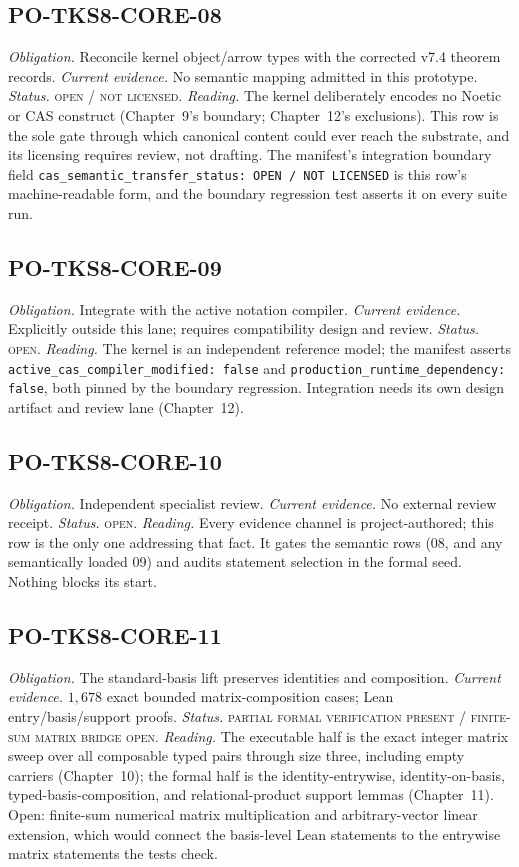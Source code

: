 \subsection*{PO-TKS8-CORE-08}
\emph{Obligation.} Reconcile kernel object/arrow types with the
corrected v7.4 theorem records. \emph{Current evidence.} No semantic
mapping admitted in this prototype. \emph{Status.}
\textsc{open / not licensed}. \emph{Reading.} The kernel deliberately
encodes no Noetic or CAS construct (Chapter~9's boundary; Chapter~12's
exclusions). This row is the sole gate through which canonical content
could ever reach the substrate, and its licensing requires review, not
drafting. The manifest's integration boundary field
\texttt{cas\_semantic\_transfer\_status: OPEN / NOT LICENSED} is this
row's machine-readable form, and the boundary regression test asserts
it on every suite run.

\subsection*{PO-TKS8-CORE-09}
\emph{Obligation.} Integrate with the active notation compiler.
\emph{Current evidence.} Explicitly outside this lane; requires
compatibility design and review. \emph{Status.} \textsc{open}.
\emph{Reading.} The kernel is an independent reference model; the
manifest asserts \texttt{active\_cas\_compiler\_modified: false} and
\texttt{production\_runtime\_dependency: false}, both pinned by the
boundary regression. Integration needs its own design artifact and
review lane (Chapter~12).

\subsection*{PO-TKS8-CORE-10}
\emph{Obligation.} Independent specialist review.
\emph{Current evidence.} No external review receipt.
\emph{Status.} \textsc{open}. \emph{Reading.} Every evidence channel
is project-authored; this row is the only one addressing that fact.
It gates the semantic rows (08, and any semantically loaded 09) and
audits statement selection in the formal seed. Nothing blocks its
start.

\subsection*{PO-TKS8-CORE-11}
\emph{Obligation.} The standard-basis lift preserves identities and
composition. \emph{Current evidence.} $1{,}678$ exact bounded
matrix-composition cases; Lean entry/basis/support proofs.
\emph{Status.} \textsc{partial formal verification present /
finite-sum matrix bridge open}. \emph{Reading.} The executable half is
the exact integer matrix sweep over all composable typed pairs through
size three, including empty carriers (Chapter~10); the formal half is
the identity-entrywise, identity-on-basis, typed-basis-composition,
and relational-product support lemmas (Chapter~11). Open: finite-sum
numerical matrix multiplication and arbitrary-vector linear extension,
which would connect the basis-level Lean statements to the entrywise
matrix statements the tests check.

